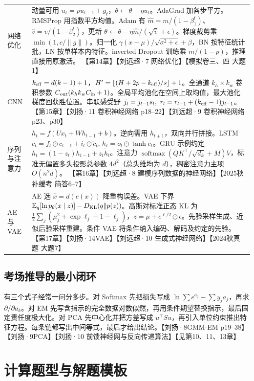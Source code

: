 \documentclass[UTF8,a4paper,zihao=-4,fontset=fandol]{ctexrep}
\begin{document}
\begin{longtable}{@{}p{.19\linewidth}p{.76\linewidth}@{}}
网络优化 & 动量可用 $u_t=\rho u_{t-1}+g_t$，$\theta\gets\theta-\eta u_t$。AdaGrad 加各步平方。RMSProp 用指数平方均值。Adam 有 $\hat m=m/(1-\beta_1^t)$、$\hat v=v/(1-\beta_2^t)$，更新 $\theta\gets\theta-\eta\hat m/(\sqrt{\hat v}+\epsilon)$。梯度裁剪乘 $\min(1,c/\|g\|)$。归一化 $\gamma(x-\mu)/\sqrt{\sigma^2+\epsilon}+\beta$，BN 按特征统计批，LN 按单样本内特征。inverted Dropout 训练乘 $m/(1-p)$，推理直接用原激活。 【第14章】【刘远超·7 网络优化】【模拟卷三、四 大题1】\\[.4em]
CNN & $k_{\rm eff}=d(k-1)+1$，$H'=\lfloor(H+2p-k_{\rm eff})/s\rfloor+1$。全通道 $k_h\times k_w$ 卷积参数 $C_{\rm out}(k_hk_wC_{\rm in}+1)$。全局平均池化在空间上取均值，最大池化梯度回获胜位置。串联感受野 $j_l=j_{l-1}s_l,\ r_l=r_{l-1}+(k_{\rm eff}-1)j_{l-1}$。 【第15章】【刘扬·11 卷积神经网络 p18–22】【刘远超·9 卷积神经网络 p23、p30】\\[.4em]
序列与注意力 & $h_t=f(Ux_t+Wh_{t-1}+b)$。逆向需用 $h_{t+1}$，双向并行拼接。LSTM $c_t=f_t\odot c_{t-1}+i_t\odot\tilde c_t$, $h_t=o_t\odot\tanh c_t$。GRU 示例约定 $h_t=(1-z_t)h_{t-1}+z_t\tilde h_t$。注意力 $\operatorname{softmax}(QK^\top/\sqrt{d_k}+M)V$，标准无偏置多头投影总参数 $4d^2$（总头维均为 $d$），稠密注意力主项 $O(n^2d)$。 【第16章】【刘远超·8 建模序列数据的神经网络】【2025秋补缓考 简答6–7】\\[.4em]
AE 与 VAE & AE 选 $\hat x=d(e(x))$ 降重构误差。VAE 下界 $\mathbb E_q[\ln p_\theta(x\mid z)]-D_{\rm KL}(q\Vert p(z))$。高斯对标准正态 KL 为 $\frac12\sum_j(\mu_j^2+\exp\ell_j-1-\ell_j)$，$z=\mu+e^{\ell/2}\odot\epsilon$。先验采样生成、近似后验采样重建。条件 VAE 将条件纳入编码、解码及约定的先验。 【第17章】【刘扬·14VAE】【刘远超·10 生成式神经网络】【2024秋真题 大题7】\\
\end{longtable}

\subsection{考场推导的最小闭环}
有三个式子经常一问分多步。对 Softmax 先把损失写成 $\ln\sum e^{a_j}-\sum y_ja_j$，再求 $\partial/\partial a_k$。对 EM 先写含指示的完全数据对数似然，再用条件期望替换指示，最后固定责任度极大化。对 PCA 先中心化并把方差写成 $u^\top S u$，再引入单位约束推出特征方程。每条链都写出中间等式，最后才给出结论。【刘扬·8GMM-EM p19–38】【刘扬·9PCA】【刘扬·10 前馈神经网与反向传递算法】【见第10、11、13章】

\section{计算题型与解题模板}
\end{document}
